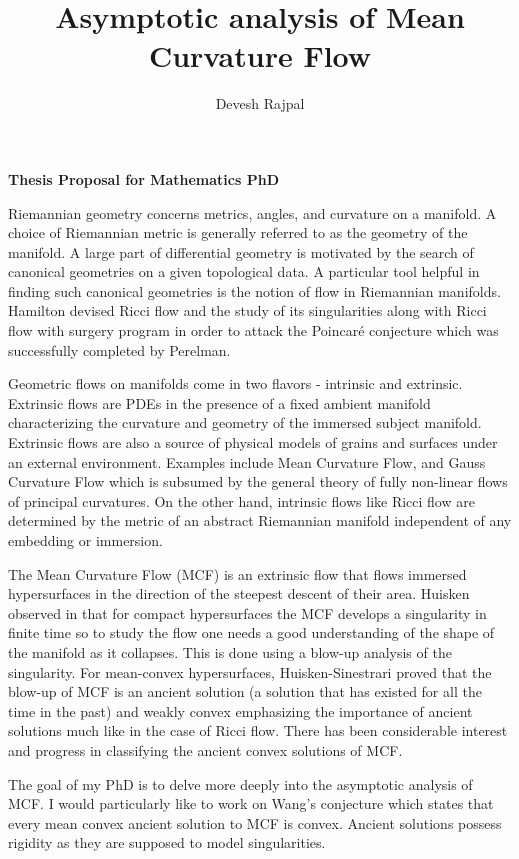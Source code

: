 \documentclass[12pt]{article}
\title{Asymptotic analysis of Mean Curvature Flow}
\author{Devesh Rajpal}
\date{}
\begin{document}
\maketitle
\begin{center}
   \textbf{Thesis Proposal for Mathematics PhD} 
\end{center}


Riemannian geometry concerns metrics, angles, and curvature on a manifold. A choice of Riemannian metric is generally referred to as the geometry of the manifold. A large part of differential geometry is motivated by the search of canonical geometries on a given topological data. A particular tool helpful in finding such canonical geometries is the notion of flow in Riemannian manifolds. %
Hamilton devised Ricci flow and the study of its singularities along with Ricci flow with surgery program in order to attack the Poincar\'{e} conjecture %
which was successfully completed by Perelman. 

Geometric flows on manifolds come in two flavors - intrinsic and extrinsic. Extrinsic flows are PDEs in the presence of a fixed ambient manifold characterizing the curvature and geometry of the immersed subject manifold. Extrinsic flows are also a source of physical models of grains and surfaces under an external environment. Examples include Mean Curvature Flow, and Gauss Curvature Flow which is subsumed by the general theory of fully non-linear flows of principal curvatures. On the other hand, intrinsic flows like Ricci flow are determined by the metric of an abstract Riemannian manifold independent of any embedding or immersion. 

The Mean Curvature Flow (MCF) is an extrinsic flow that flows immersed hypersurfaces  %
in the direction of the steepest descent of their area. Huisken observed in \cite{huisken1984flow} that for compact hypersurfaces the MCF develops a singularity in finite time so to study the flow one needs a good understanding of the shape of the manifold as it collapses. This is done using a blow-up analysis of the singularity. For mean-convex hypersurfaces, Huisken-Sinestrari proved that the blow-up of MCF is an ancient solution (a solution that has existed for all the time in the past) and weakly convex emphasizing the importance of ancient solutions much like in the case of Ricci flow. There has been considerable interest and progress in classifying the ancient convex solutions of MCF. 

The goal of my PhD is to delve more deeply into the asymptotic analysis of MCF. I would particularly like to work on Wang's conjecture which states that every mean convex ancient solution to MCF is convex.  %
Ancient solutions possess rigidity as they are supposed to model singularities.

\newpage

\nocite{*}
\end{document}
